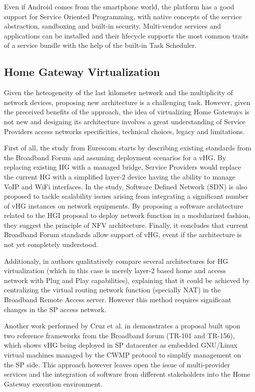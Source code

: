 Even if Android comes from the smartphone world, the platform has a good support for Service Oriented Programming, with native concepts of the service abstraction, sandboxing and built-in security. Multi-vendor services and applications can be installed and their lifecycle supports the most common traits of a service bundle with the help of the built-in Task Scheduler.

\subsection{Home Gateway Virtualization}
Given the heteogeneity of the last kilometer network and the multiplicity of network devices, proposing new architecture is a challenging task.
However, given the preceived benefits of the approach, the idea of virtualizing Home Gateways is not new and designing  its architecture involves a great understanding of Service Providers access networks specificities, technical choices, legacy and limitations.

First of all, the study from Eurescom \cite{daniel_abgrall_virtual_????} starts by describing existing standards from the Broadband Forum and assuming deployment scenarios for a vHG.
By replacing existing HG with a managed bridge, Service Providers would replace the current HG with a simplified layer-2 device having the ability to manage VoIP and WiFi interfaces.
In the study, Software Defined Network (SDN) is also proposed to tackle scalability issues arising from integrating a significant number of vHG instances on network equipments.
By proposing a software architecture related to the HGI proposal to deploy network function in a modularized fashion, they suggest the principle of NFV architecture.
Finally,  it concludes that current Broadband Forum standards allow support of vHG, event if the architecture is not yet completely understood.

Additionaly, in \cite{da_silva_home_2011} authors qualitatively compare several architectures for HG virtualization (which in this case is merely layer-2 based home and access network with Plug and Play capabilities), explaining that it could be achieved by centralizing the virtual routing network function (specially NAT) in the Broadband Remote Access server. However this method requires significant changes in the SP access network.

Another work performed by Cruz et al. in \cite{cruz_architecture_2013} demonstrates a proposal built upon two reference frameworks from the Broadband forum (TR-101 and TR-156), which shows vHG being deployed in SP datacenter as embedded GNU/Linux virtual machines managed by the CWMP protocol to simplify management on the SP side. This approach however leaves open the issue of multi-provider services and the integration of software from different stakeholders into the Home Gateway execution environment.

